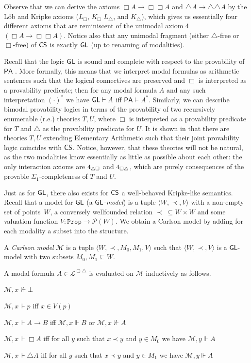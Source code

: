 \documentclass[runningheads,orivec]{llncs}
\newcommand{\CS}{\textnormal{\textsf{CS}}}
\newcommand{\GL}{\textnormal{\textsf{GL}}}
\newcommand{\PA}{\mathsf{PA}}
\newcommand{\la}{\langle}
\newcommand{\ra}{\rangle}
\newcommand{\Pw}{\mathcal{P}}
\newcommand{\Mw}{\mathcal{M}}
\newcommand{\La}{\mathcal{L}}
\newcommand{\LaBi}{\La^{\Box \triangle}}
\newcommand{\Prop}{\mathtt{Prop}}
\begin{document}
Observe that we can derive the axioms $\Box A \to \Box \Box A$ and $\triangle A \to \triangle \triangle A$ by the L{\"o}b and Kripke axioms ($L_\Box$, $K_\Box$ $L_\triangle$, and $K_\triangle$), which gives us essentially four different axioms that are reminiscent of the unimodal axiom $4$ $(\Box A \to \Box \Box A)$. 
Notice also that any unimodal fragment (either $\triangle$-free or $\Box$-free) of $\CS$ is exactly $\GL$ (up to renaming of modalities).

Recall that the logic $\GL$ is sound and complete with respect to the provability of $\PA$ \cite{Solovay76}. More formally, this means that we interpret modal formulas as arithmetic sentences such that the logical connectives are preserved and $\Box$ is interpreted as a provability predicate; then for any modal formula $A$ and any such interpretation $(\cdot)^*$ we have $\GL \vdash A$ iff $\PA \vdash A^*$. 
Similarly, we can describe bimodal provability logics in terms of the provability of two recursively enumerable (r.e.) theories $T,U$, where $\Box$ is interpreted as a provability predicate for $T$ and $\triangle$ as the provability predicate for $U$. 
It is shown in \cite[Theorem 3.15.ii]{Smorynski85} that there are theories $T,U$ extending Elementary Arithmetic such that their joint provability logic coincides with $\CS$. Notice, however, that these theories will not be natural, as the two modalities know essentially as little as possible about each other: the only interaction axioms are $\textnormal{4}_{\triangle\Box}$ and $\textnormal{4}_{\Box\triangle}$, which are purely consequences of the provable $\Sigma_1$-completeness of $T$ and $U$. 

Just as for $\GL$, there also exists for $\CS$ a well-behaved Kripke-like semantics. 
Recall that a model for $\GL$ (a \emph{$\GL$-model}) is a tuple $\la W ,{\prec}, V \ra$ with a non-empty set of points~$W$, a conversely wellfounded relation $\prec \; \subseteq W \times W$ and some valuation function $V : \Prop \to \Pw (W)$. We obtain a Carlson model by adding for each modality a subset into the structure.

\begin{definition}
    A \emph{Carlson model} $\Mw$ is a tuple $\la W, \prec , M_0 , M_1 , V \ra$ such that $\la W, \prec , V \ra$ is a $\mathsf{GL}$-model with two subsets $M_0 , M_1 \subseteq W$. 

    A modal formula $A \in \LaBi$ is evaluated on $\Mw$ inductively as follows.

    $\Mw , x \nVdash \bot$

    $\Mw , x \Vdash p$ iff $x \in V(p)$

    $\Mw , x \Vdash A \to B$ iff $\Mw , x \Vdash B$ or $\Mw , x \nVdash A$

    $\Mw , x \Vdash \Box A$ iff for all $y$ such that $x\prec y$ and $y \in M_0$ we have $\Mw , y \Vdash A$

    $\Mw , x \Vdash \triangle A$ iff for all $y$ such that $x\prec y$ and $y \in M_1$ we have $\Mw , y \Vdash A$
\end{definition}
\end{document}
